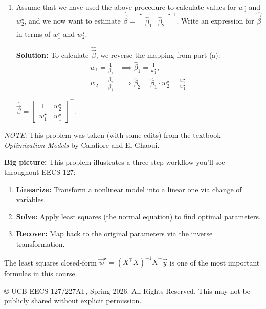 \documentclass[10pt]{article}
\theoremstyle{definition}
\theoremstyle{plain}
\begin{document}
\begin{enumerate}[label=(\alph*)]
    \item Assume that we have used the above procedure to calculate values for $w_1^\star$ and $w_2^\star$, and we now want to estimate $\widehat{\vec{\beta}} = \begin{bmatrix} \hat{\beta}_1 & \hat{\beta}_2 \end{bmatrix}^\top$. Write an expression for $\widehat{\vec{\beta}}$ in terms of $w_1^\star$ and $w_2^\star$.

    \textbf{Solution:} To calculate $\widehat{\vec{\beta}}$, we reverse the mapping from part (a):
    \begin{align}
        w_1 = \frac{1}{\beta_1} &\implies \hat{\beta}_1 = \frac{1}{w_1^\star}, \\
        w_2 = \frac{\beta_2}{\beta_1} &\implies \hat{\beta}_2 = \hat{\beta}_1 \cdot w_2^\star = \frac{w_2^\star}{w_1^\star}.
    \end{align}

    \begin{result}
    $\widehat{\vec{\beta}} = \begin{bmatrix} \dfrac{1}{w_1^\star} & \dfrac{w_2^\star}{w_1^\star} \end{bmatrix}^\top$.
    \end{result}
\end{enumerate}

\vspace{1em}
\noindent\textit{NOTE}: This problem was taken (with some edits) from the textbook \textit{Optimization Models} by Calafiore and El Ghaoui.

\begin{intuition}
\textbf{Big picture:} This problem illustrates a three-step workflow you'll see throughout EECS 127:
\begin{enumerate}[label=\arabic*.]
    \item \textbf{Linearize:} Transform a nonlinear model into a linear one via change of variables.
    \item \textbf{Solve:} Apply least squares (the normal equation) to find optimal parameters.
    \item \textbf{Recover:} Map back to the original parameters via the inverse transformation.
\end{enumerate}
The least squares closed-form $\vec{w}^\star = (X^\top X)^{-1} X^\top \vec{y}$ is one of the most important formulas in this course.
\end{intuition}

\vfill
\noindent\footnotesize{\copyright{} UCB EECS 127/227AT, Spring 2026. \scriptsize{All Rights Reserved. This may not be publicly shared without explicit permission.}}
\end{document}

